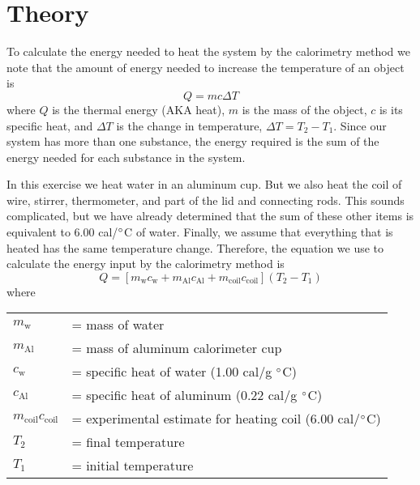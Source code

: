 \section{Theory}
To calculate the energy needed to heat the system by the calorimetry method we note that the amount of energy needed to increase the temperature of an object is
\begin{equation} \label{e:qheat1}
	Q = mc\Delta T 
\end{equation}
where $Q$ is the thermal energy (AKA heat), $m$ is the mass of the object, $c$ is its specific heat, and $\Delta T$ is the change in temperature, $\Delta T =T_2 - T_1$.  Since our system has more than one substance, the energy required is the sum of the energy needed for each substance in the system.

In this exercise we heat water in an aluminum cup.   But we also heat the coil of wire, stirrer, thermometer, and part of the lid and connecting rods.  This sounds complicated, but we have already determined that the sum of these other items is equivalent to 6.00 cal/$^{\circ}$C of water. Finally, we assume that everything that is heated has the same temperature change.  Therefore, the equation we use to calculate the energy input by the calorimetry method is
\begin{equation}\label{e:qheat2}
	Q = [m_{\textrm{w}}c_{\textrm{w}} + m_{\textrm{Al}}c_{\textrm{Al}} + m_{\textrm{coil}}c_{\textrm{coil}}](T_2 - T_1)
\end{equation}
where	
\vspace{12pt}

\begin{tabular}{ll}
	\toprule
	$m_{\textrm{w}}$ &= mass of water\\
	$m_{\textrm{Al}}$	&= mass of aluminum calorimeter cup\\
	$c_{\textrm{w}}$	&= specific heat of water (1.00 cal/g $^{\circ}$C)\\
	$c_{\textrm{Al}}$	&= specific heat of aluminum (0.22 cal/g $^{\circ}$C)\\
	$m_{\textrm{coil}}c_{\textrm{coil}}$ &= experimental estimate for heating coil (6.00 cal/$^{\circ}$C)\\
	$T_2$	&= final temperature\\
	$T_1$	&= initial temperature\\
	\bottomrule
\end{tabular}
\vspace{12pt}


